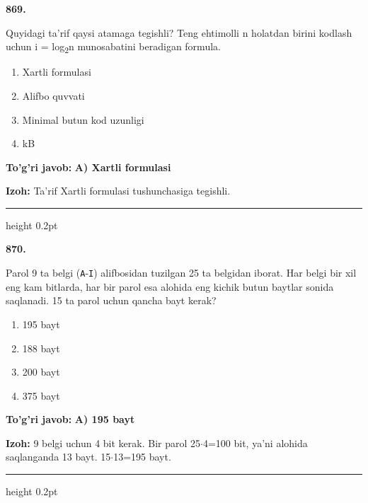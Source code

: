 \documentclass[10pt,a4paper,oneside]{article}
\begin{document}
\noindent\textbf{\color{ink}869.}
\par
Quyidagi ta'rif qaysi atamaga tegishli? Teng ehtimolli n holatdan birini kodlash uchun i = log\textsubscript{2}n munosabatini beradigan formula.
\begin{enumerate}[label=\Alph*),leftmargin=9mm]
\item Xartli formulasi
\item Alifbo quvvati
\item Minimal butun kod uzunligi
\item kB
\end{enumerate}
\begin{tcolorbox}[enhanced,breakable,colback=teal!4,colframe=teal!50!black,boxrule=0.5pt,arc=1.1mm,left=3mm,right=3mm,top=1.7mm,bottom=1.7mm,before skip=2mm,after skip=2mm]
\textbf{\color{teal}To'g'ri javob:} \textbf{A) Xartli formulasi}
\par\smallskip
\textbf{Izoh:} Ta'rif Xartli formulasi tushunchasiga tegishli.
\end{tcolorbox}
\vspace{2mm}\hrule height 0.2pt \vspace{3mm}

\noindent\textbf{\color{ink}870.}
\par
Parol 9 ta belgi (\texttt{A}-\texttt{I}) alifbosidan tuzilgan 25 ta belgidan iborat. Har belgi bir xil eng kam bitlarda, har bir parol esa alohida eng kichik butun baytlar sonida saqlanadi. 15 ta parol uchun qancha bayt kerak?
\begin{enumerate}[label=\Alph*),leftmargin=9mm]
\item 195 bayt
\item 188 bayt
\item 200 bayt
\item 375 bayt
\end{enumerate}
\begin{tcolorbox}[enhanced,breakable,colback=teal!4,colframe=teal!50!black,boxrule=0.5pt,arc=1.1mm,left=3mm,right=3mm,top=1.7mm,bottom=1.7mm,before skip=2mm,after skip=2mm]
\textbf{\color{teal}To'g'ri javob:} \textbf{A) 195 bayt}
\par\smallskip
\textbf{Izoh:} 9 belgi uchun 4 bit kerak. Bir parol 25\ensuremath{\cdot}4=100 bit, ya'ni alohida saqlanganda 13 bayt. 15\ensuremath{\cdot}13=195 bayt.
\end{tcolorbox}
\vspace{2mm}\hrule height 0.2pt \vspace{3mm}
\end{document}
